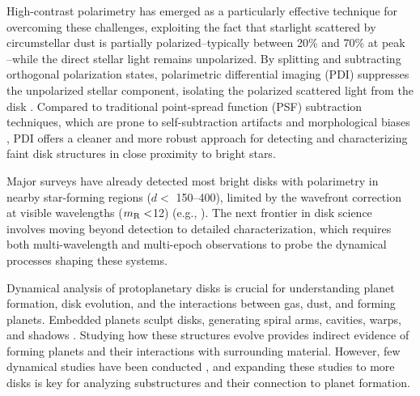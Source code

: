 High-contrast polarimetry has emerged as a particularly effective technique for overcoming these challenges, exploiting the fact that starlight scattered by circumstellar dust is partially polarized--typically between 20\% and 70\% at peak \citep{tazaki_effect_2019}--while the direct stellar light remains unpolarized. By splitting and subtracting orthogonal polarization states, polarimetric differential imaging (PDI) suppresses the unpolarized stellar component, isolating the polarized scattered light from the disk \citep{kuhn_imaging_2001}. Compared to traditional point-spread function (PSF) subtraction techniques, which are prone to self-subtraction artifacts and morphological biases \citep{lafreniere_new_2007, soummer_detection_2012}, PDI offers a cleaner and more robust approach for detecting and characterizing faint disk structures in close proximity to bright stars.

Major surveys have already detected most bright disks with polarimetry in nearby star-forming regions ($d <$ \SIrange{150}{400}{\parsec}), limited by the wavefront correction at visible wavelengths ($m_{\text R}<$12) (e.g., \citealt{avenhaus_disks_2018,garufi_disks_2020,rich_gemini-lights_2022,ren_protoplanetary_2023,valegard_sphere_2024,ginski_sphere_2024,garufi_sphere_2024}). The next frontier in disk science involves moving beyond detection to detailed characterization, which requires both multi-wavelength and multi-epoch observations to probe the dynamical processes shaping these systems.

Dynamical analysis of protoplanetary disks is crucial for understanding planet formation, disk evolution, and the interactions between gas, dust, and forming planets. Embedded planets sculpt disks, generating spiral arms, cavities, warps, and shadows \citep{garufi_shadows_2014,dong_what_2017,dong_how_2017,andrews_observations_2020}. Studying how these structures evolve provides indirect evidence of forming planets and their interactions with surrounding material. However, few dynamical studies have been conducted \citep[e.g.,][]{boccaletti_fast-moving_2015,debes_chasing_2017,stolker_variable_2017,ren_dynamical_2020, bertrang_moving_2020,avsar_search_2024}, and expanding these studies to more disks is key for analyzing substructures and their connection to planet formation.

